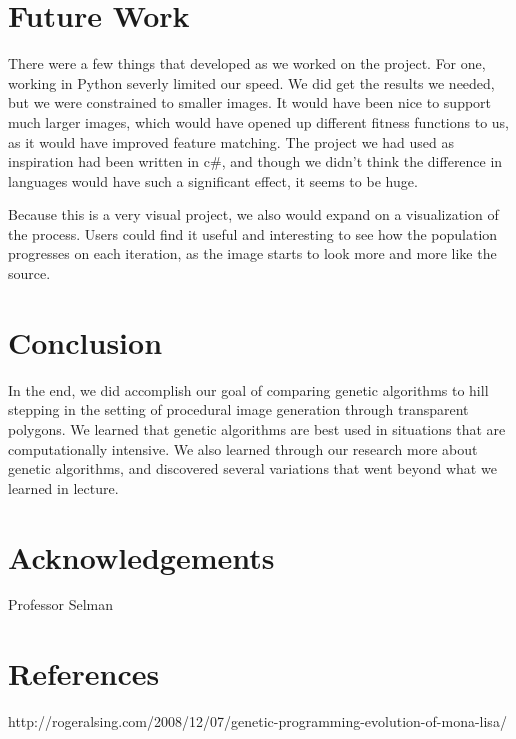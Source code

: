 \documentclass[12pt,letterpaper]{article}
\begin{document}
\section{Future Work}
There were a few things that developed as we worked on the project. For one, working in Python severly limited our speed. We did get the results we needed, but we were constrained to smaller images. It would have been nice to support much larger images, which would have opened up different fitness functions to us, as it would have improved feature matching. The project we had used as inspiration had been written in c\#, and though we didn't think the difference in languages would have such a significant effect, it seems to be huge.

Because this is a very visual project, we also would expand on a visualization of the process. Users could find it useful and interesting to see how the population progresses on each iteration, as the image starts to look more and more like the source.

\section{Conclusion}

In the end, we did accomplish our goal of comparing genetic algorithms to hill stepping in the setting of procedural image generation through transparent polygons. We learned that genetic algorithms are best used in situations that are computationally intensive. We also learned through our research more about genetic algorithms, and discovered several variations that went beyond what we learned in lecture.

\section{Acknowledgements}

Professor Selman

\section{References}

http://rogeralsing.com/2008/12/07/genetic-programming-evolution-of-mona-lisa/
\end{document}
